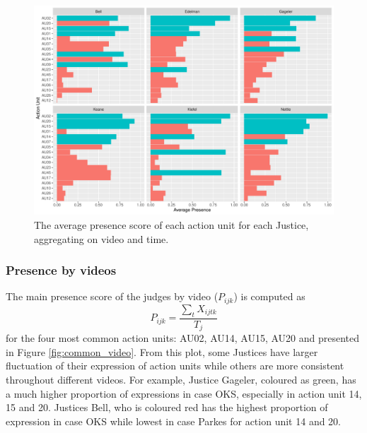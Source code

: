 \documentclass{monashthesis}
\begin{document}
\begin{figure}

{\centering \includegraphics[width=1\linewidth]{figures/most-common-1} 

}

\caption{The average presence score of each action unit for each Justice, aggregating on video and time. \label{fig:mean_presence}}\label{fig:most-common}
\end{figure}

\hypertarget{presence-by-videos}{%
\subsubsection{Presence by videos}\label{presence-by-videos}}

The main presence score of the judges by video (\(P_{ijk}\)) is computed as \[P_{ijk} = \frac{\sum_{t}X_{ijtk}}{T_j}\] for the four most common action units: AU02, AU14, AU15, AU20 and presented in Figure \ref{fig:common_video}. From this plot, some Justices have larger fluctuation of their expression of action units while others are more consistent throughout different videos. For example, Justice Gageler, coloured as green, has a much higher proportion of expressions in case OKS, especially in action unit 14, 15 and 20. Justices Bell, who is coloured red has the highest proportion of expression in case OKS while lowest in case Parkes for action unit 14 and 20.
\end{document}
